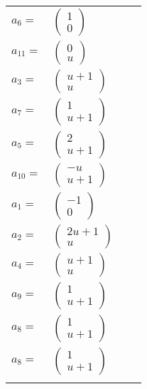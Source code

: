 \documentclass[1p]{elsarticle_modified}
\theoremstyle{definition}
\begin{document}
\begin{tabular}{m{7pt} m{180pt} m{7pt} m{180pt} }
\flushright $a_{6}=$&$\begin{pmatrix}1\\0\end{pmatrix}$ \\
\flushright $a_{11}=$&$\begin{pmatrix}0\\u\end{pmatrix}$ \\
\flushright $a_{3}=$&$\begin{pmatrix}u+1\\u\end{pmatrix}$ \\
\flushright $a_{7}=$&$\begin{pmatrix}1\\u+1\end{pmatrix}$ \\
\flushright $a_{5}=$&$\begin{pmatrix}2\\u+1\end{pmatrix}$ \\
\flushright $a_{10}=$&$\begin{pmatrix}- u\\u+1\end{pmatrix}$ \\
\flushright $a_{1}=$&$\begin{pmatrix}-1\\0\end{pmatrix}$ \\
\flushright $a_{2}=$&$\begin{pmatrix}2 u+1\\u\end{pmatrix}$ \\
\flushright $a_{4}=$&$\begin{pmatrix}u+1\\u\end{pmatrix}$ \\
\flushright $a_{9}=$&$\begin{pmatrix}1\\u+1\end{pmatrix}$ \\
\flushright $a_{8}=$&$\begin{pmatrix}1\\u+1\end{pmatrix}$\\ \flushright $a_{8}=$&$\begin{pmatrix}1\\u+1\end{pmatrix}$\\&\end{tabular}
\end{document}
